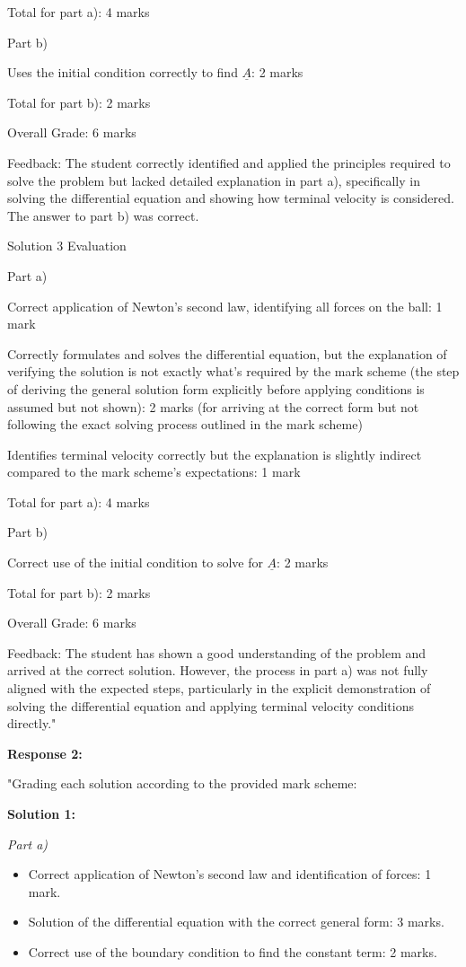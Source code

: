 \documentclass[a4paper,11pt]{article}
\begin{document}
Total for part a): 4 marks

Part b)

Uses the initial condition correctly to find \(\underline{A}\): 2 marks

Total for part b): 2 marks

Overall Grade: 6 marks

Feedback: The student correctly identified and applied the principles required to solve the problem but lacked detailed explanation in part a), specifically in solving the differential equation and showing how terminal velocity is considered. The answer to part b) was correct.

Solution 3 Evaluation

Part a)

Correct application of Newton's second law, identifying all forces on the ball: 1 mark

Correctly formulates and solves the differential equation, but the explanation of verifying the solution is not exactly what's required by the mark scheme (the step of deriving the general solution form explicitly before applying conditions is assumed but not shown): 2 marks (for arriving at the correct form but not following the exact solving process outlined in the mark scheme) 

Identifies terminal velocity correctly but the explanation is slightly indirect compared to the mark scheme’s expectations: 1 mark

Total for part a): 4 marks

Part b)

Correct use of the initial condition to solve for \(\underline{A}\): 2 marks

Total for part b): 2 marks

Overall Grade: 6 marks

Feedback: The student has shown a good understanding of the problem and arrived at the correct solution. However, the process in part a) was not fully aligned with the expected steps, particularly in the explicit demonstration of solving the differential equation and applying terminal velocity conditions directly."

\textbf{Response 2:}

"Grading each solution according to the provided mark scheme:

\textbf{Solution 1:}

\textit{Part a)}

\begin{itemize}
    \item Correct application of Newton's second law and identification of forces: 1 mark.
    \item Solution of the differential equation with the correct general form: 3 marks.
    \item Correct use of the boundary condition to find the constant term: 2 marks.
\end{itemize}
\end{document}

